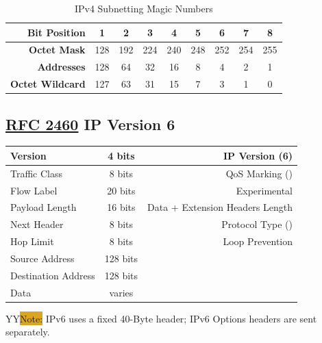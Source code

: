 \documentclass[12pt]{article}
\newcommand{\printColor}{Y}								%
\newcommand{\note}[1]{\if\printColor Y{\colorbox{#1}{Note:}}\else{\underline{Note:}}\fi}
\newcommand{\RFC}[1]{\href{https://datatracker.ietf.org/doc/html/rfc#1}{RFC #1}}
\begin{document}
	\begin{table}[H]
	\centering
	\caption{IPv4 Subnetting Magic Numbers \label{tab:SUBNETTING}}
	\begin{tabular}{r | cccccccc}\hline
	\textbf{Bit Position}	& 1	& 2	& 3	& 4	& 5	& 6	& 7 & 8\\\hline
	\textbf{Octet Mask}	& 128 & 192 & 224 & 240 & 248 & 252 & 254 & 255\\\hline
	\textbf{Addresses}	& 128	& 64	& 32	& 16	& 8	& 4	& 2	& 1\\\hline
	\textbf{Octet Wildcard}	& 127	& 63	& 31 	& 15	& 7	& 3	& 1	& 0\\\hline
	\end{tabular}\end{table}


	\subsection[RFC 2460 IPv6]{\RFC{2460} IP Version 6 \label{subsec:IPV6}}
	\begin{table}[H]
	\centering
	\begin{tabular}{| l | c | r |}\hline
	Version			& 4 bits	& IP Version (6)\\\hline
	Traffic Class			& 8 bits	& QoS Marking (\Cref{sec:QOS})\\\hline
	Flow Label			& 20 bits	& Experimental\\\hline
	Payload Length		& 16 bits	& Data + Extension Headers Length\\\hline
	Next Header		& 8 bits	& Protocol Type (\Cref{tab:L3 PROTOCOL})\\\hline
	Hop Limit			& 8 bits	& Loop Prevention\\\hline
	Source Address		& 128 bits	&\\\hline
	Destination Address	& 128 bits	&\\\hline
	Data				& varies	&\\\hline
	\end{tabular}\end{table}
	\note{Goldenrod} IPv6 uses a fixed 40-Byte header; IPv6 Options headers are sent separately.
\end{document}

